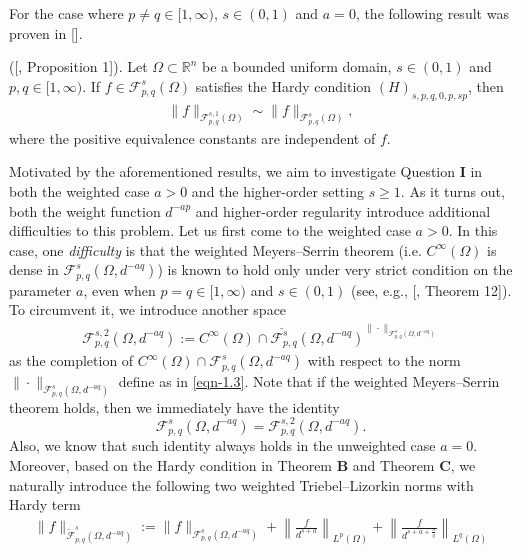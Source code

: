 \documentclass[11pt,twoside]{article}
\def\boz{{\Omega}}
\theoremstyle{mylem}
\theoremstyle{definition}
\numberwithin{equation}{section}
\begin{document}
For the case where $p\ne q\in [1,\infty)$, $s\in (0,1)$ and $a=0$, the following result was proven in [\cite{cjlz2022}].

\medskip
{ ([\cite{cjlz2022}, Proposition 1]).   Let \(\Omega\subset\mathbb{R}^n\) be a bounded uniform domain, 
$s\in(0, 1)$ and $p,q\in[1,\infty)$. If $f\in\mathcal F_{p,q}^s(\Omega)$ satisfies the Hardy condition $(H)_{s,p,q,0,p,sp}$, then
\begin{align*}
\|f\|_{\mathcal F_{p,q}^{s,1}(\boz)}\sim\|f\|_{{\mathcal F}_{p,q}^{s}(\boz)},
\end{align*}
where the positive equivalence constants are independent of $f$.
}

Motivated by the aforementioned results, we aim to investigate Question {\bf I} in both the weighted case $a>0$ 
and the higher-order setting $s\ge 1$. As it turns out, both the weight function $d^{-ap}$ and higher-order regularity 
introduce additional difficulties to this problem. Let us first come to the weighted case 
$a>0$. In this case, 
one \emph{difficulty} is that the weighted Meyers--Serrin theorem (i.e. $C^\infty(\Omega)$
is dense in ${\mathcal F}_{p,q}^{s}(\boz,d^{-aq})$) is known to hold only under very strict condition on the parameter $a$,
even when $p=q\in [1,\infty)$ and $s\in (0,1)$ (see, e.g., [\cite{dk2021}, Theorem 12]). To circumvent it, 
we introduce another space 
\begin{align}\label{eqn-1.xx4}
\mathcal F_{p,q}^{s,2}(\boz,d^{-aq}):=\overline{C^\infty(\boz)\cap \mathcal F_{p, q}^{s}(\boz,d^{-aq})}^{\|\cdot\|_{\mathcal F_{p,q}^s(\boz,d^{-aq})}}
\end{align}
as the completion of $C^\infty(\boz)\cap \mathcal F_{p, q}^{s}(\boz,d^{-aq})$
with respect to the norm $\|\cdot\|_{\mathcal F_{p,q}^s(\boz,d^{-aq})}$ define as in 
\eqref{eqn-1.3}.
Note that if the weighted Meyers--Serrin theorem holds, then we immediately have the identity
$${\mathcal F}_{p,q}^{s}(\boz,d^{-aq})=\mathcal F_{p,q}^{s,2}(\boz,d^{-aq}).$$
Also, we know that such identity always holds in the unweighted case $a=0$.
Moreover, based on the Hardy condition in Theorem {\bf B}
and Theorem {\bf C}, we naturally introduce the following
two weighted Triebel--Lizorkin norms with Hardy term
\begin{align}\label{159}
\|f\|_{\widetilde{\mathcal{F}}_{p,q}^s(\Omega,d^{-aq})}
:=\|f\|_{\mathcal F_{p,q}^s(\Omega,d^{-aq})}
+\left\|\frac{f}{d^{s+a}}\right\|_{L^p(\Omega)}
+\left\|\frac{f}{d^{s+a+\frac{n}{q}}}\right\|_{L^q(\Omega)}
\end{align}
\end{document}
